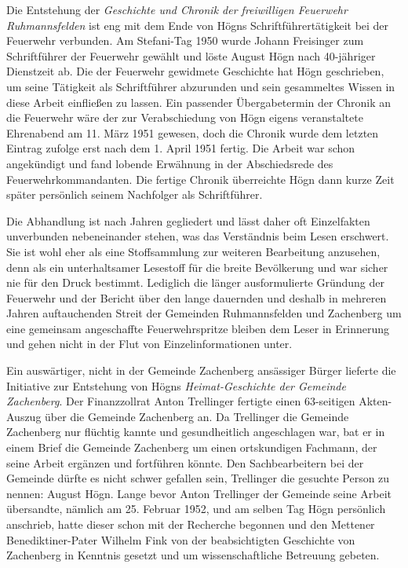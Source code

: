 Die Entstehung der \textit{Geschichte und Chronik der freiwilligen
Feuerwehr Ruhmannsfelden} ist eng mit dem Ende von Högns
Schriftführertätigkeit bei der Feuerwehr verbunden. Am Stefani-Tag
1950 wurde Johann Freisinger zum Schriftführer der Feuerwehr gewählt
und löste August Högn nach 40-jähriger Dienstzeit ab. Die
 der Feuerwehr gewidmete
Geschichte hat Högn geschrieben, um seine Tätigkeit als Schriftführer
abzurunden und sein gesammeltes Wissen in diese Arbeit einfließen
zu lassen. Ein passender Übergabetermin der Chronik an die Feuerwehr
wäre der zur Verabschiedung von Högn eigens veranstaltete Ehrenabend
am 11. März 1951 gewesen, doch die Chronik wurde dem letzten Eintrag
zufolge erst nach dem 1. April 1951 fertig. Die Arbeit war schon
angekündigt und fand lobende Erwähnung in der Abschiedsrede des
Feuerwehrkommandanten. Die fertige Chronik überreichte Högn dann kurze
Zeit später persönlich seinem Nachfolger als Schriftführer.

Die Abhandlung ist nach Jahren gegliedert und lässt daher oft
Einzelfakten unverbunden nebeneinander stehen, was das Verständnis beim
Lesen erschwert. Sie ist wohl eher als eine Stoffsammlung zur
weiteren Bearbeitung anzusehen, denn als ein unterhaltsamer Lesestoff
für die breite Bevölkerung und war sicher nie für den Druck bestimmt.
Lediglich die länger ausformulierte Gründung der Feuerwehr und der
Bericht über den lange dauernden und deshalb in mehreren Jahren
auftauchenden Streit der Gemeinden Ruhmannsfelden und Zachenberg um
eine gemeinsam angeschaffte Feuerwehrspritze bleiben dem Leser in
Erinnerung und gehen nicht in der Flut von Einzelinformationen unter.

Ein auswärtiger, nicht in der Gemeinde Zachenberg ansässiger Bürger
lieferte die Initiative zur Entstehung von Högns
\textit{Heimat-Geschichte der Gemeinde Zachenberg}. Der Finanzzollrat
Anton Trellinger fertigte einen 63-seitigen Akten-Auszug über die
Gemeinde Zachenberg an. Da Trellinger die Gemeinde Zachenberg nur
flüchtig kannte und gesundheitlich angeschlagen war, bat er in einem
Brief die Gemeinde Zachenberg um einen ortskundigen Fachmann, der seine
Arbeit ergänzen und fortführen könnte. Den Sachbearbeitern bei der
Gemeinde dürfte es nicht schwer gefallen sein, Trellinger die gesuchte
Person zu nennen: August Högn. Lange bevor Anton Trellinger der
Gemeinde seine Arbeit übersandte, nämlich am 25. Februar 1952, und am
selben Tag Högn persönlich anschrieb, hatte dieser schon mit der
Recherche begonnen und den Mettener Benediktiner-Pater Wilhelm Fink von
der beabsichtigten Geschichte von Zachenberg in Kenntnis gesetzt und um
wissenschaftliche Betreuung gebeten.

